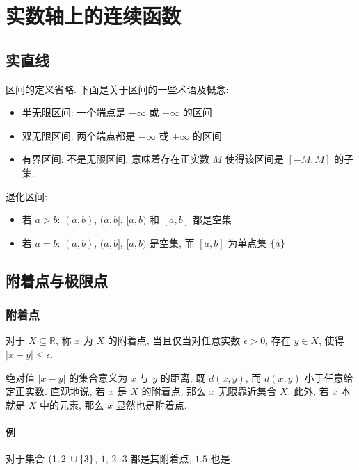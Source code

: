 \documentclass[UTF8]{ctexart}
\theoremstyle{mystyle}
\theoremstyle{myremark}
\theoremstyle{plain}
\newcommand{\R}{\mathbb R}
\DeclarePairedDelimiter\set{\{}{\}}
\begin{document}
\tableofcontents
\section{实数轴上的连续函数}
\subsection{实直线}
区间的定义省略. 下面是关于区间的一些术语及概念:
\begin{itemize}
    \item 半无限区间: 一个端点是 $ -\infty $ 或 $ +\infty $ 的区间
    \item 双无限区间: 两个端点都是 $ -\infty $ 或 $ +\infty $ 的区间
    \item 有界区间: 不是无限区间. 意味着存在正实数 $ M $ 使得该区间是 $ [-M, M] $ 的子集.
\end{itemize}

退化区间:
\begin{itemize}
    \item 若 $ a > b $: $ (a, b) $, $ (a, b] $, $ [a, b) $ 和 $ [a, b] $ 都是空集
    \item 若 $ a = b $: $ (a, b) $, $ (a, b] $, $ [a, b) $ 是空集, 而 $ [a, b] $ 为单点集 $ \set{a} $
\end{itemize}

\subsection{附着点与极限点}
\subsubsection{附着点}
\begin{definition}
    对于 $ X \subseteq \R $, 称 $ x $ 为 $ X $ 的附着点, 当且仅当对任意实数 $ \epsilon > 0 $, 存在 $ y \in X $, 使得 $ |x - y| \leqslant \epsilon $.
\end{definition}

绝对值 $ |x - y| $ 的集合意义为 $ x $ 与 $ y $ 的距离, 既 $ d(x, y) $, 而 $ d(x, y) $ 小于任意给定正实数. 直观地说, 若 $ x $ 是 $ X $ 的附着点, 那么 $ x $ 无限靠近集合 $ X $. 此外, 若 $ x $ 本就是 $ X $ 中的元素, 那么 $ x $ 显然也是附着点.

\paragraph{例}
对于集合 $ (1, 2] \cup \set{3} $, $ 1 $, $ 2 $, $ 3 $ 都是其附着点, $ 1.5 $ 也是.
\end{document}
